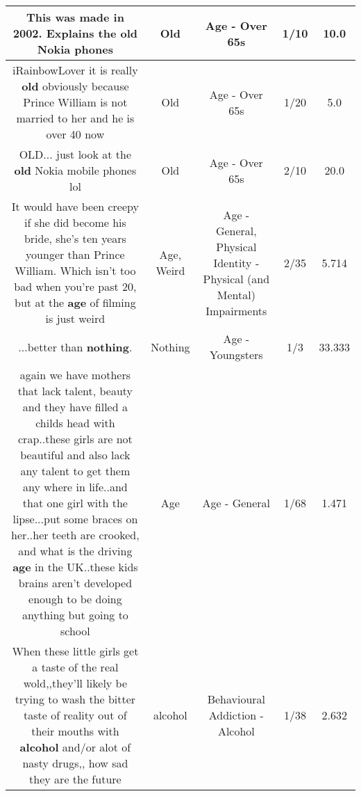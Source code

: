 \documentclass[11pt]{article}
\newlength\mylength
\begin{document}
\begin{center}
\begin{longtable}{|C{.65\mylength}|C{.30\mylength}|C{.12\mylength}|C{.12\mylength}|C{.12\mylength}|}
  \small This was made in 2002. Explains the \textbf{old} Nokia phones\normalsize   & Old & Age - Over 65s & 1/10 & 10.0 \\  \hline
  \small iRainbowLover it is really \textbf{old} obviously because Prince William is not married to her and he is over 40 now\normalsize   & Old & Age - Over 65s & 1/20 & 5.0 \\  \hline
  \small OLD... just look at the \textbf{old} Nokia mobile phones lol\normalsize   & Old & Age - Over 65s & 2/10 & 20.0 \\  \hline
  \small It would have been creepy if she did become his bride, she's ten years younger than Prince William. Which isn't too bad when you're past 20, but at the \textbf{age} of filming is just weird\normalsize   & Age, Weird & Age - General, Physical Identity - Physical (and Mental) Impairments & 2/35 & 5.714 \\  \hline
  \small ...better than \textbf{nothing}.\normalsize   & Nothing & Age - Youngsters & 1/3 & 33.333 \\  \hline
  \small again we have mothers that lack talent, beauty and they have filled a childs head with crap..these girls are not beautiful and also lack any talent to get them any where in life..and that one girl with the lipse...put some braces on her..her teeth are crooked, and what is the driving \textbf{age} in the UK..these kids brains aren't developed enough to be doing anything but going to school\normalsize   & Age & Age - General & 1/68 & 1.471 \\  \hline
  \small When these little girls get a taste of the real wold,,they'll likely be trying to wash the bitter taste of reality out of their mouths with \textbf{alcohol} and/or alot of nasty drugs,, how sad they are the future\normalsize   & alcohol & Behavioural Addiction - Alcohol & 1/38 & 2.632 \\  \hline

\end{longtable}
\end{center}
\end{document}
